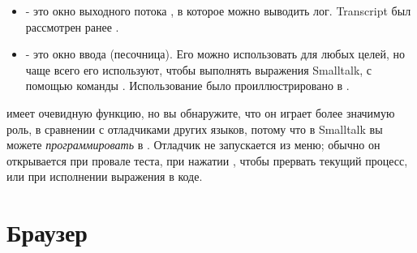 \documentclass[a4paper,10pt,twoside]{book}
\begin{document}
\begin{itemize}
	\item{} - это окно выходного потока , в которое можно выводить лог. Transcript был рассмотрен ранее .
	
	\item{} - это окно ввода (песочница).
	Его можно использовать для любых целей, но чаще всего его используют, чтобы выполнять выражения Smalltalk, с помощью команды  . Использование  было проиллюстрировано в .
\end{itemize}

 имеет очевидную функцию, но вы обнаружите, что он играет более значимую роль, в сравнении с отладчиками других языков, потому что в  Smalltalk вы можете \emph{программировать} в .  Отладчик не запускается из меню; обычно он открывается при провале теста, при нажатии , чтобы прервать текущий процесс, или при исполнении выражения  в коде.

\section{Браузер}

\end{document}
